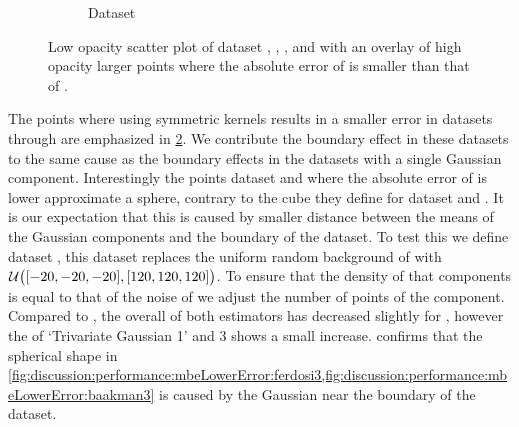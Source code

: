 \begin{figure}
\begin{subfigure}{0.23\textwidth}
			\caption{Dataset \baakmanThree}
			\label{fig:discussion:performance:mbeLowerError:baakman3}
		\end{subfigure}			
		\caption{Low opacity scatter plot of dataset %
			 \ferdosiTwo, %
			 \baakmanTwo, %
			 \ferdosiThree, and %
			 \baakmanThree %
			with an overlay of high opacity larger points where the absolute error of \mbe is smaller than that of \sambe.}
		\label{fig:discussion:performance:multisphere:mbeLowerError}
	\end{figure}	
	The points where using symmetric kernels results in a smaller error in datasets \ferdosiTwo through \baakmanThree are emphasized in
	\cref{fig:discussion:performance:multisphere:mbeLowerError}. We contribute the boundary effect in these datasets to the same cause as the boundary effects in the datasets with a single Gaussian component. Interestingly the points dataset \ferdosiThree and \baakmanThree where the absolute error of \mbe is lower approximate a sphere, contrary to the cube they define for dataset \ferdosiTwo and \baakmanTwo. It is our expectation that this is caused by smaller distance between the means of the Gaussian components and the boundary of the dataset. 
		To test this we define dataset \ferdosiThreeNoise, this dataset replaces the uniform random background of \ferdosiThree with $\mathcal{U}\big([-20, -20, -20], [120, 120, 120]\big)$. To ensure that the density of that components is equal to that of the noise of \ferdosiThree we adjust the number of points of the component. 
		Compared to \ferdosiThree, the overall \mse of both estimators has decreased slightly for \ferdosiThreeNoise, however the \mse of `Trivariate Gaussian 1' and 3 shows a small increase. 
		 confirms that the spherical shape in \cref{fig:discussion:performance:mbeLowerError:ferdosi3,fig:discussion:performance:mbeLowerError:baakman3} is caused by the Gaussian near the boundary of the dataset.
